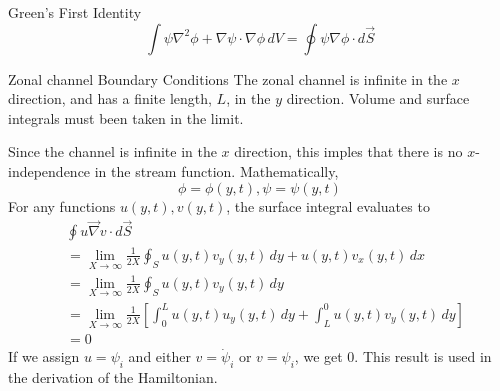 \documentclass[12pt]{article}
\begin{document}
\begin{section}{Green's First Identity}
    $$
    \int \psi \nabla^2 \phi + \nabla \psi \cdot \nabla \phi \, dV = \oint \psi \nabla \phi \cdot d \vec S
    $$
\end{section}

\begin{section}{Zonal channel Boundary Conditions}
    The zonal channel is infinite in the $x$ direction, and has a finite length, $L$, in the $y$ direction. Volume and surface integrals must been taken in the limit.

    Since the channel is infinite in the $x$ direction, this imples that there is no $x$-independence in the stream function. Mathematically,
    $$
        \phi = \phi(y, t), \psi = \psi(y, t)
    $$
    For any functions $u(y,t), v(y,t)$, the surface integral evaluates to
    \begin{align*}
        &\oint u \vec\nabla v \cdot d\vec S \\
        &= \lim_{X \rightarrow \infty} \frac{1}{2X} \oint_S u(y,t) v_y(y,t) \, dy + u(y,t) v_x(y,t) \, dx \\
        &= \lim_{X \rightarrow \infty} \frac{1}{2X} \oint_S u(y,t) v_y(y,t) \, dy \\
        &= \lim_{X \rightarrow \infty} \frac{1}{2X} \left[ \int_0^L u(y,t)u_y(y,t) \, dy + \int_L^0 u(y,t)v_y(y,t) \, dy \right] \\
        &= 0
    \end{align*}
    If we assign $u = \psi_i$ and either $v = \dot\psi_i$ or $v = \psi_i$, we get 0. This result is used in the derivation of the Hamiltonian.
\end{section}
\end{document}
